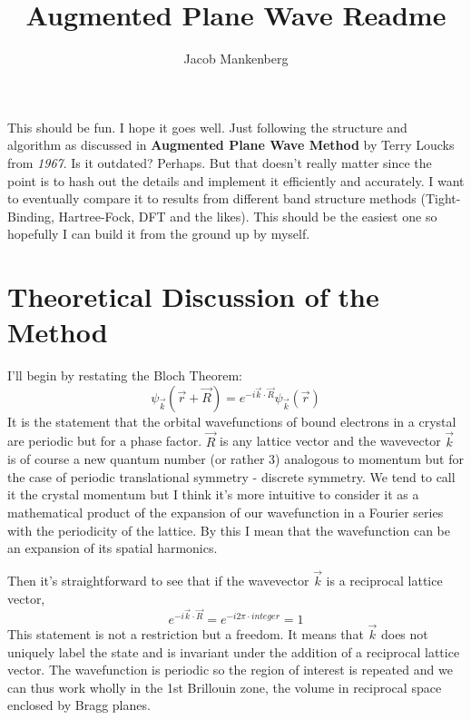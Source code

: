\documentclass[11pt]{article}
\numberwithin{equation}{section}
\begin{document}
\title{Augmented Plane Wave Readme}
\author{Jacob Mankenberg}
\maketitle



This should be fun. I hope it goes well. Just following the structure and algorithm as discussed in \textbf{Augmented Plane Wave Method} by Terry Loucks from \textit{1967}. Is it outdated? Perhaps. But that doesn't really matter since the point is to hash out the details and implement it efficiently and accurately. I want to eventually compare it to results from different band structure methods (Tight-Binding, Hartree-Fock, DFT and the likes). This should be the easiest one so hopefully I can build it from the ground up by myself.

\section{Theoretical Discussion of the Method}
I'll begin by restating the Bloch Theorem:
\begin{equation}
\psi_{\vec{k}}(\vec{r} + \vec{R}) = e^{-i \vec{k}\cdot\vec{R}} \psi_{\vec{k}}(\vec{r})
\end{equation}
It is the statement that the orbital wavefunctions of bound electrons in a crystal are periodic but for a phase factor. $\vec{R}$ is any lattice vector and the wavevector $\vec{k}$ is of course a new quantum number (or rather 3) analogous to momentum but for the case of periodic translational symmetry - discrete symmetry. We tend to call it the crystal momentum but I think it's more intuitive to consider it as a mathematical product of the expansion of our wavefunction in a Fourier series with the periodicity of the lattice. By this I mean that the wavefunction can be an expansion of its spatial harmonics.

Then it's straightforward to see that if the wavevector $\vec{k}$ is a reciprocal lattice vector,
\begin{equation}
e^{-i\vec{k}\cdot\vec{R}} = e^{-i2\pi\cdot integer} = 1
\end{equation}
This statement is not a restriction but a freedom. It means that $\vec{k}$ does not uniquely label the state and is invariant under the addition of a reciprocal lattice vector. The wavefunction is periodic so the region of interest is repeated and we can thus work wholly in the 1st Brillouin zone, the volume in reciprocal space enclosed by Bragg planes.
\end{document}
